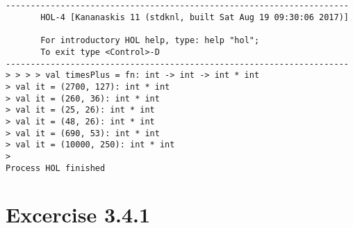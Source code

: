 \documentclass{report}
\begin{document}
\begin{session}
  \begin{scriptsize}
\begin{verbatim}


---------------------------------------------------------------------
       HOL-4 [Kananaskis 11 (stdknl, built Sat Aug 19 09:30:06 2017)]

       For introductory HOL help, type: help "hol";
       To exit type <Control>-D
---------------------------------------------------------------------
> > > > val timesPlus = fn: int -> int -> int * int
> val it = (2700, 127): int * int
> val it = (260, 36): int * int
> val it = (25, 26): int * int
> val it = (48, 26): int * int
> val it = (690, 53): int * int
> val it = (10000, 250): int * int
> 
Process HOL finished

\end{verbatim}
  \end{scriptsize}
\end{session}


\chapter{Excercise 3.4.1}
\label{cha:3.4.1}
\end{document}
